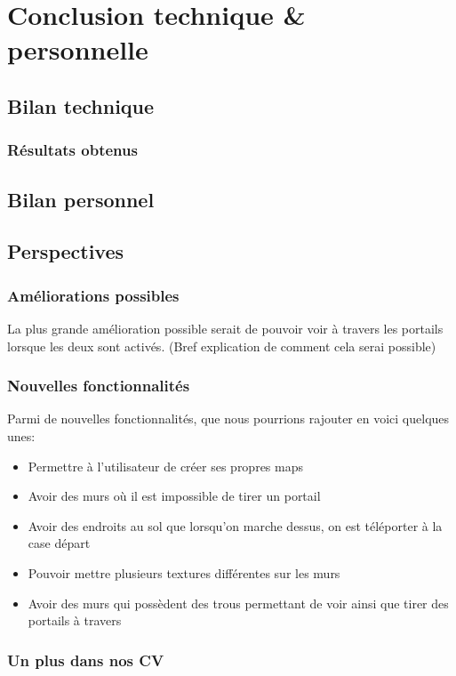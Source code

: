 \documentclass[12pt]{report}
\begin{document}
    
\section{Conclusion technique \& personnelle}
\subsection{Bilan technique}
\subsubsection{Résultats obtenus}
\subsection{Bilan personnel}
\subsection{Perspectives}
\subsubsection{Améliorations possibles}

La plus grande amélioration possible serait de pouvoir voir à travers les portails
lorsque les deux sont activés. (Bref explication de comment cela serai possible)

\subsubsection{Nouvelles fonctionnalités}

Parmi de nouvelles fonctionnalités, que nous pourrions rajouter en voici quelques unes:
\begin{itemize}
	\item Permettre à l'utilisateur de créer ses propres maps
	\item Avoir des murs où il est impossible de tirer un portail
	\item Avoir des endroits au sol que lorsqu'on marche dessus, on est téléporter à la case départ
	\item Pouvoir mettre plusieurs textures différentes sur les murs
	\item Avoir des murs qui possèdent des trous permettant de voir ainsi que tirer des portails à travers
\end{itemize}

\subsubsection{Un plus dans nos CV}



\end{document}
